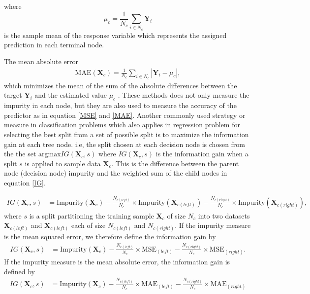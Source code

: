 where  $$\mu_{c}=\frac{1}{N_{c}} \sum_{i\in N_{c}} \textbf{Y}_{i}$$ is the sample mean of the response variable which represents the  assigned prediction in each terminal node.

The mean absolute error  
\begin{align}
\text{MAE}\left(\textbf{X}_{c} \right)=\frac{1}{N_{c}} \sum_{i\in N_{c}} \left|\textbf{Y}_{i}-\mu_{c}\right|, 
\end{align}
 which minimizes the mean of the sum of the absolute differences between the target $\textbf{Y}_{i}$ and the estimated value  $\mu_{c}$ \citep{moisen2008classification}. These methods does not only measure the impurity in each node, but they are also used to measure the accuracy of the predictor as in equation \ref{MSE} and \ref{MAE}. Another commonly used strategy or measure in classification problems which also applies in regression problem for selecting the best split from a set of possible split is to maximize the information gain at each tree node. i.e, the split chosen at each decision node is chosen from the the set $\text{argmax} IG(\textbf{X}_{c},s)$ where $IG(\textbf{X}_{c},s)$ is the information gain when a split $s$ is applied to sample data $\textbf{X}_c$. This is the difference between the parent node (decision node) impurity and the weighted sum of the child nodes in equation \ref{IG}. 
 
 \begin{align}
 IG(\textbf{X}_c,s)&= \text{Impurity}(\textbf{X}_c)-\frac{N_{c(left)}}{N_c}\times \text{Impurity}(\textbf{X}_{c(left)})- \frac{N_{c(right)}}{N_c}\times \text{Impurity} (\textbf{X}_{c(right)}), \label{IG}
 \end{align}
 where $s$ is a split partitioning the training sample $\textbf{X}_c$ of size $N_c$ into two datasets $\textbf{X}_{c(left)}$ and $\textbf{X}_{c(left)}$ each of size $N_{c(left)}$ and $N_{c(right)}$.
If the impurity measure is the mean squared error, we therefore define the information gain by
 \begin{align}
 IG(\textbf{X}_c,s)&= \text{Impurity}(\textbf{X}_c)-\frac{N_{c(left)}}{N_c}\times \text{MSE}_{(left)}- \frac{N_{c(right)}}{N_c}\times \text{MSE}_{(right)}.
  \end{align}
If the impurity measure is the mean absolute error, the information gain is defined by   
 \begin{align}
 IG(\textbf{X}_c,s)&= \text{Impurity}(\textbf{X}_c)-\frac{N_{c(left)}}{N_c}\times \text{MAE}_{(left)}- \frac{N_{c(right)}}{N_c}\times \text{MAE}_{(right)} 
 \end{align}
 
